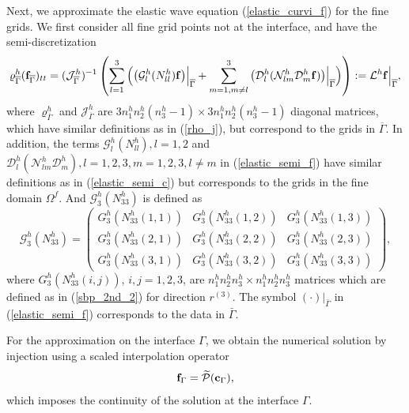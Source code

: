 Next, we approximate the elastic wave equation (\ref{elastic_curvi_f}) for the fine grids. We first consider all fine grid points not at the interface, and have the semi-discretization
\begin{equation}\label{elastic_semi_f}
\varrho^h_{\overline{\Gamma}} ({\bf f}_{\overline{\Gamma}})_{tt} =
( \mathcal{ J}_{\overline{\Gamma}}^{h})^{-1}\left(\sum_{l=1}^3\Big(\big(\mathcal{G}_l^{h}({N}_{ll}^h){\bf f}\big)\Big|_{\overline{\Gamma}}+\sum_{m=1,m\neq l}^3\big(\mathcal{D}_l^{h}(\mathcal{N}_{lm}^{h}\mathcal{D}_m^{h}{\bf f})\big)\Big|_{\overline{\Gamma}}\Big)\right) := \mathcal{L}^h{\bf f}\Big|_{\overline{\Gamma}},
\end{equation}
where ${\varrho}^{h}_{\overline{\Gamma}}$ and ${\mathcal{J}}^{h}_{\overline{\Gamma}}$ are $3n_1^hn_2^h(n_3^h-1)\times 3n_1^hn_2^h(n_3^h-1)$ diagonal matrices, which have similar definitions as in (\ref{rho_j}), but correspond to the grids in $\overline{\Gamma}$. In addition, the terms $\mathcal{G}_l^h({N}_{ll}^h), l = 1,2$ and $\mathcal{D}_l^h(\mathcal{N}_{lm}^h\mathcal{D}_m^h), l=1,2,3,m=1,2,3,l\neq m$ in (\ref{elastic_semi_f}) have similar definitions as in (\ref{elastic_semi_c}) but corresponds to the grids in the fine domain $\Omega^f$. And $\mathcal{G}_3^h({N}_{33}^h)$ is defined as
\[ \mathcal{G}^{h}_3({N}_{33}^h) = \left(\begin{array}{ccc}
G_3^{h}(N_{33}^{h}(1,1)) & G_3^{h}(N_{33}^{h}(1,2))  & G_3^{h}(N_{33}^{h}(1,3)) \\
G_3^{h}(N_{33}^{h}(2,1)) & G_3^{h}(N_{33}^{h}(2,2))  & G_3^{h}(N_{33}^{h}(2,3)) \\
G_3^{h}(N_{33}^{h}(3,1)) & G_3^{h}(N_{33}^{h}(3,2))  & G_3^{h}(N_{33}^{h}(3,3)) \end{array}\right),\]
where ${G}_3^{h}(N_{33}^{h}(i,j))$, $i,j = 1,2,3$, are $n_1^{h}n_2^{h}n_3^{h}\times n_1^{h}n_2^{h}n_3^{h}$ matrices which are defined as in (\ref{sbp_2nd_2}) for direction $r^{(3)}$. The symbol $(\cdot)\big|_{\bar{\Gamma}}$ in (\ref{elastic_semi_f}) corresponds to the data in $\bar{\Gamma}$.

For the approximation on the interface $\Gamma$, we obtain the numerical solution by injection using a scaled interpolation operator
\begin{equation}\label{continuous_sol}
{\bf f}_{\Gamma} = \wt{\mathcal{P}}({\bf c}_{\Gamma}),
\end{equation}
which imposes the continuity of the solution at the interface $\Gamma$. 

